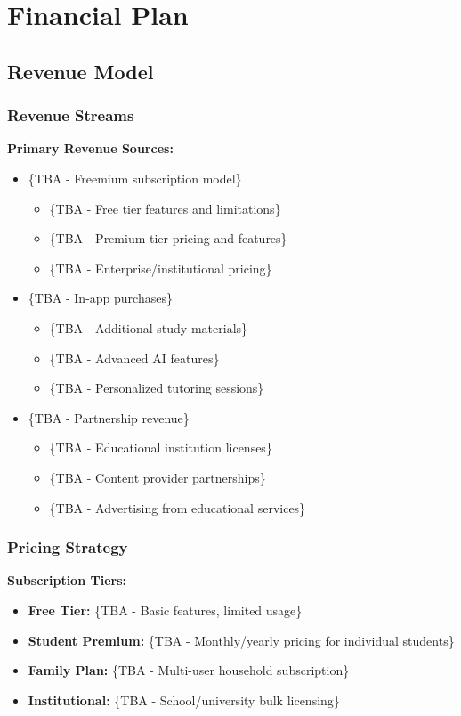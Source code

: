 \section{Financial Plan}

\subsection{Revenue Model}
\subsubsection{Revenue Streams}
\textbf{Primary Revenue Sources:}
\begin{itemize}
    \item \{TBA - Freemium subscription model\}
    \begin{itemize}
        \item \{TBA - Free tier features and limitations\}
        \item \{TBA - Premium tier pricing and features\}
        \item \{TBA - Enterprise/institutional pricing\}
    \end{itemize}
    \item \{TBA - In-app purchases\}
    \begin{itemize}
        \item \{TBA - Additional study materials\}
        \item \{TBA - Advanced AI features\}
        \item \{TBA - Personalized tutoring sessions\}
    \end{itemize}
    \item \{TBA - Partnership revenue\}
    \begin{itemize}
        \item \{TBA - Educational institution licenses\}
        \item \{TBA - Content provider partnerships\}
        \item \{TBA - Advertising from educational services\}
    \end{itemize}
\end{itemize}

\subsubsection{Pricing Strategy}
\textbf{Subscription Tiers:}
\begin{itemize}
    \item \textbf{Free Tier:} \{TBA - Basic features, limited usage\}
    \item \textbf{Student Premium:} \{TBA - Monthly/yearly pricing for individual students\}
    \item \textbf{Family Plan:} \{TBA - Multi-user household subscription\}
    \item \textbf{Institutional:} \{TBA - School/university bulk licensing\}
\end{itemize}


